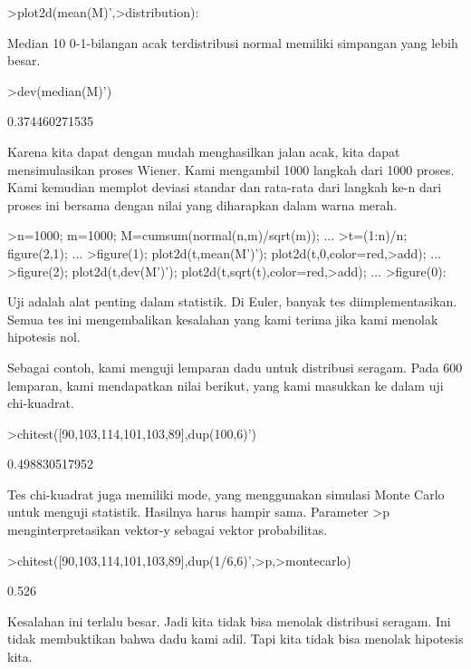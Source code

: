 \documentclass{article}
\begin{document}
\begin{eulernotebook}
\begin{eulercomment}
\begin{eulercomment}
\begin{eulerprompt}
>plot2d(mean(M)',>distribution):
\end{eulerprompt}
\begin{eulercomment}
Median 10 0-1-bilangan acak terdistribusi normal memiliki simpangan
yang lebih besar.
\end{eulercomment}
\begin{eulerprompt}
>dev(median(M)')
\end{eulerprompt}
\begin{euleroutput}
  0.374460271535
\end{euleroutput}
\begin{eulercomment}
Karena kita dapat dengan mudah menghasilkan jalan acak, kita dapat
mensimulasikan proses Wiener. Kami mengambil 1000 langkah dari 1000
proses. Kami kemudian memplot deviasi standar dan rata-rata dari
langkah ke-n dari proses ini bersama dengan nilai yang diharapkan
dalam warna merah.
\end{eulercomment}
\begin{eulerprompt}
>n=1000; m=1000; M=cumsum(normal(n,m)/sqrt(m)); ...
>t=(1:n)/n; figure(2,1); ...
>figure(1); plot2d(t,mean(M')'); plot2d(t,0,color=red,>add); ...
>figure(2); plot2d(t,dev(M')'); plot2d(t,sqrt(t),color=red,>add); ...
>figure(0):
\end{eulerprompt}
\begin{eulercomment}
Uji adalah alat penting dalam statistik. Di Euler, banyak tes
diimplementasikan. Semua tes ini mengembalikan kesalahan yang kami
terima jika kami menolak hipotesis nol.

Sebagai contoh, kami menguji lemparan dadu untuk distribusi seragam.
Pada 600 lemparan, kami mendapatkan nilai berikut, yang kami masukkan
ke dalam uji chi-kuadrat.
\end{eulercomment}
\begin{eulerprompt}
>chitest([90,103,114,101,103,89],dup(100,6)')
\end{eulerprompt}
\begin{euleroutput}
  0.498830517952
\end{euleroutput}
\begin{eulercomment}
Tes chi-kuadrat juga memiliki mode, yang menggunakan simulasi Monte
Carlo untuk menguji statistik. Hasilnya harus hampir sama. Parameter
\textgreater{}p menginterpretasikan vektor-y sebagai vektor probabilitas.
\end{eulercomment}
\begin{eulerprompt}
>chitest([90,103,114,101,103,89],dup(1/6,6)',>p,>montecarlo)
\end{eulerprompt}
\begin{euleroutput}
  0.526
\end{euleroutput}
\begin{eulercomment}
Kesalahan ini terlalu besar. Jadi kita tidak bisa menolak distribusi
seragam. Ini tidak membuktikan bahwa dadu kami adil. Tapi kita tidak
bisa menolak hipotesis kita.


\end{eulercomment}
\end{eulercomment}
\end{eulercomment}
\end{eulernotebook}
\end{document}
